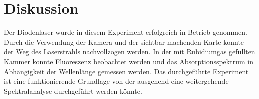 \newpage
\section{Diskussion}
Der Diodenlaser wurde in diesem Experiment erfolgreich in Betrieb genommen.
Durch die Verwendung der Kamera und der sichtbar machenden Karte konnte der Weg des Laserstrahls nachvollzogen werden.
In der mit Rubidiumgas gefüllten Kammer konnte Fluoreszenz beobachtet werden und das Absorptionsspektrum in Abhängigkeit
der Wellenlänge gemessen werden.
Das durchgeführte Experiment ist eine funktionierende Grundlage von der ausgehend
 eine weitergehende Spektralanalyse durchgeführt werden könnte. 



\printbibliography


